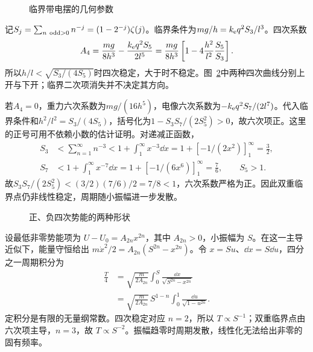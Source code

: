 \begin{figure}[H]\centering
{}
\caption{临界带电摆的几何参数}\label{fig:es3-h7-q}
\end{figure}
\begin{solution}
记$S_j=\sum_{n\ {\rm odd}>0}n^{-j}=(1-2^{-j})\zeta(j)$。临界条件为$mg/h=k_{\rm e} q^2S_3/l^3$。四次系数
\[A_4=\frac{mg}{8h^3}-\frac{k_{\rm e} q^2S_5}{2l^5}
=\frac{mg}{8h^3}\left[1-4\frac{h^2}{l^2}\frac{S_5}{S_3}\right].\]
所以$h/l<\sqrt{S_3/(4S_5)}$时四次稳定，大于时不稳定。图~\ref{fig:es3-h7-s}中两种四次曲线分别上开与下开；临界二次项消失并不决定其方向。

若$A_4=0$，重力六次系数为$mg/(16h^5)$，电像六次系数为$-k_{\rm e} q^2S_7/(2l^7)$。代入临界条件和$h^2/l^2=S_3/(4S_5)$，括号化为$1-S_3S_7/(2S_5^2)>0$，故六次项正。这里的正号可用不依赖小数的估计证明。对递减正函数，
\[\begin{aligned}
S_3&<\sum_{n=1}^{\infty}n^{-3}<1+\int_1^\infty x^{-3}\dd x
=1+[-1/(2x^2)]_1^\infty=\frac32,\\
S_7&<1+\int_1^\infty x^{-7}\dd x
=1+[-1/(6x^6)]_1^\infty=\frac76,\qquad S_5>1.
\end{aligned}
\]
故$S_3S_7/(2S_5^2)<(3/2)(7/6)/2=7/8<1$，六次系数严格为正。因此双重临界点仍非线性稳定，周期随小振幅进一步发散。
\begin{figure}[H]\centering
{}
\caption{正、负四次势能的两种形状}\label{fig:es3-h7-s}
\end{figure}


设最低非零势能项为 $U-U_0=A_{2n}x^{2n}$，其中 $A_{2n}>0$，小振幅为 $S$。在这一主导近似下，能量守恒给出 $m\dot x^2/2=A_{2n}(S^{2n}-x^{2n})$。令 $x=Su$、$\dd x=S\dd u$，四分之一周期积分为
\[\begin{aligned}
\frac T4&=\sqrt{\frac{m}{2A_{2n}}}\int_0^S\frac{\dd x}{\sqrt{S^{2n}-x^{2n}}}\\
&=\sqrt{\frac{m}{2A_{2n}}}\,S^{1-n}\int_0^1\frac{\dd u}{\sqrt{1-u^{2n}}}.
\end{aligned}\]
定积分是有限的无量纲常数。四次稳定对应 $n=2$，所以 $T\propto S^{-1}$；双重临界点由六次项主导，$n=3$，故 $T\propto S^{-2}$。振幅趋零时周期发散，线性化无法给出非零的固有频率。
\end{solution}

